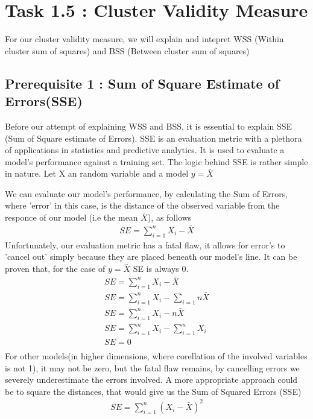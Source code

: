 \documentclass[12pt]{article}
\begin{document}
		 \section*{Task 1.5 : Cluster Validity Measure}
		 	For our cluster validity measure, we will explain and intepret WSS (Within cluster sum of squares) and BSS (Between cluster sum of squares)
			\subsection*{Prerequisite 1 : Sum of Square Estimate of Errors(SSE)}
				Before our attempt of explaining WSS and BSS, it is essential to explain SSE (Sum of Square estimate of Errors). SSE is an evaluation metric with a plethora of applications in statistics and predictive analytics. It is used to evaluate a model's performance against a training set. The logic behind
				SSE is rather simple in nature. Let X an random variable and a model $y=\bar{X}$
				\begin{center}
				\end{center}
				We can evaluate our model's performance, by calculating the Sum of Errors, where 'error' in this case, is the distance of the observed variable from the responce of our model (i.e the mean $\bar{X}$), as follows
				\begin{align}
					SE = \sum_{i=1}^{n}{X_i-\bar{X}}
				\end{align}
				Unfortunately, our evaluation metric has a fatal flaw, it allows for error's to 'cancel out' simply because they are placed beneath our model's line. It can be proven that, for the case of $y=\bar{X}$ SE is always 0.
				\begin{align}
					SE = \sum_{i=1}^{n}{X_i-\bar{X}} \\
					SE = \sum_{i=1}^{n}{X_i} - \sum_{i=1}{n}{\bar{X}} \\
					SE = \sum_{i=1}^{n}{X_i} - n\bar{X} \\
					SE = \sum_{i=1}^{n}{X_i} - \sum_{i=1}^{n}{X_i} \\
					SE = 0 \\
				\end{align}
				For other models(in higher dimensions, where corellation of the involved variables is not 1), it may not be zero, but the fatal flaw remains, by cancelling errors we severely underestimate the errors involved. A more appropriate approach could be to square the distances, that would give us the Sum of Squared Errors (SSE)
				\begin{align}
					SE = \sum_{i=1}^{n}{(X_i-\bar{X})}^2
				\end{align}
\end{document}
